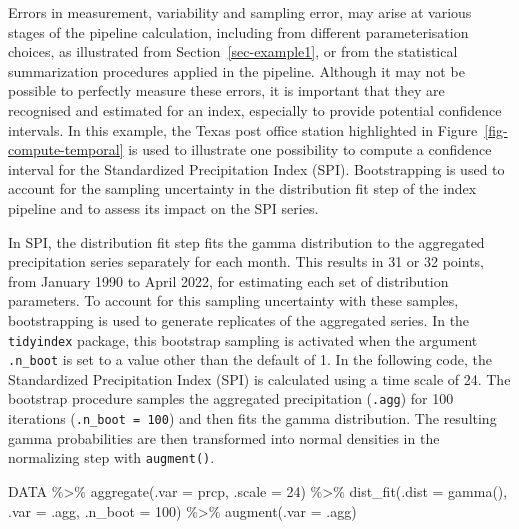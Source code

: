 \documentclass[
]{interact}
\newenvironment{Shaded}{\begin{snugshade}}{\end{snugshade}}
\newcommand{\AttributeTok}[1]{\textcolor[rgb]{0.40,0.45,0.13}{#1}}
\newcommand{\DecValTok}[1]{\textcolor[rgb]{0.68,0.00,0.00}{#1}}
\newcommand{\FunctionTok}[1]{\textcolor[rgb]{0.28,0.35,0.67}{#1}}
\newcommand{\NormalTok}[1]{\textcolor[rgb]{0.00,0.23,0.31}{#1}}
\newcommand{\SpecialCharTok}[1]{\textcolor[rgb]{0.37,0.37,0.37}{#1}}
\begin{document}
Errors in measurement, variability and sampling error, may arise at
various stages of the pipeline calculation, including from different
parameterisation choices, as illustrated from
Section~\ref{sec-example1}, or from the statistical summarization
procedures applied in the pipeline. Although it may not be possible to
perfectly measure these errors, it is important that they are recognised
and estimated for an index, especially to provide potential confidence
intervals. In this example, the Texas post office station highlighted in
Figure~\ref{fig-compute-temporal} is used to illustrate one possibility
to compute a confidence interval for the Standardized Precipitation
Index (SPI). Bootstrapping is used to account for the sampling
uncertainty in the distribution fit step of the index pipeline and to
assess its impact on the SPI series.

In SPI, the distribution fit step fits the gamma distribution to the
aggregated precipitation series separately for each month. This results
in 31 or 32 points, from January 1990 to April 2022, for estimating each
set of distribution parameters. To account for this sampling uncertainty
with these samples, bootstrapping is used to generate replicates of the
aggregated series. In the \texttt{tidyindex} package, this bootstrap
sampling is activated when the argument \texttt{.n\_boot} is set to a
value other than the default of 1. In the following code, the
Standardized Precipitation Index (SPI) is calculated using a time scale
of 24. The bootstrap procedure samples the aggregated precipitation
(\texttt{.agg}) for 100 iterations (\texttt{.n\_boot\ =\ 100}) and then
fits the gamma distribution. The resulting gamma probabilities are then
transformed into normal densities in the normalizing step with
\texttt{augment()}.

\begin{Shaded}
\begin{Highlighting}[]
\NormalTok{DATA }\SpecialCharTok{\%\textgreater{}\%} 
  \FunctionTok{aggregate}\NormalTok{(}\AttributeTok{.var =}\NormalTok{ prcp, }\AttributeTok{.scale =} \DecValTok{24}\NormalTok{) }\SpecialCharTok{\%\textgreater{}\%} 
  \FunctionTok{dist\_fit}\NormalTok{(}\AttributeTok{.dist =} \FunctionTok{gamma}\NormalTok{(), }\AttributeTok{.var =}\NormalTok{ .agg, }\AttributeTok{.n\_boot =} \DecValTok{100}\NormalTok{) }\SpecialCharTok{\%\textgreater{}\%} 
  \FunctionTok{augment}\NormalTok{(}\AttributeTok{.var =}\NormalTok{ .agg)}
\end{Highlighting}
\end{Shaded}
\end{document}
